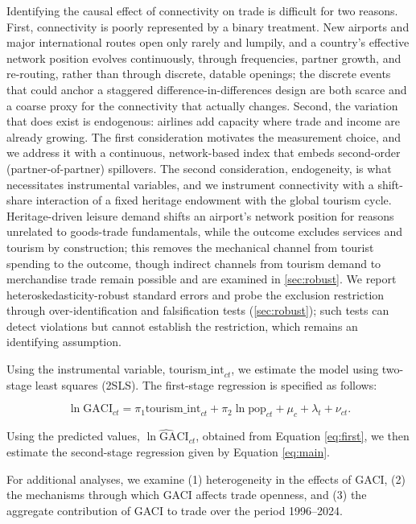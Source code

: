 Identifying the causal effect of connectivity on trade is difficult for two
reasons. First, connectivity is poorly represented by a binary treatment. New
airports and major international routes open only rarely and lumpily, and a
country's effective network position evolves continuously, through
frequencies, partner growth, and re-routing, rather than through discrete,
datable openings; the discrete events that could anchor a staggered
difference-in-differences design are both scarce and a coarse proxy for the
connectivity that actually changes. Second, the variation that does exist is
endogenous: airlines add capacity where trade and income are already growing.
The first consideration motivates the measurement choice, and we address it
with a continuous, network-based index that embeds second-order
(partner-of-partner) spillovers. The second consideration, endogeneity, is
what necessitates instrumental variables, and we instrument connectivity with
a shift-share interaction
\citep{GoldsmithPinkham_2020,Borusyak_2022} of a fixed heritage endowment with
the global tourism cycle. Heritage-driven leisure demand shifts an airport's
network position for reasons unrelated to goods-trade fundamentals, while the
outcome excludes services and tourism by construction; this removes the
mechanical channel from tourist spending to the outcome, though indirect
channels from tourism demand to merchandise trade remain possible and are
examined in \ref{sec:robust}. We report
heteroskedasticity-robust standard errors and probe the exclusion restriction
through over-identification and falsification tests (\ref{sec:robust}); such
tests can detect violations but cannot establish the restriction, which
remains an identifying assumption.

Using the instrumental variable, $\text{tourism\_int}_{ct}$, we estimate the model using two-stage least squares (2SLS). The first-stage regression is specified as follows:

\begin{equation}
\ln\mathrm{GACI}_{ct} = \pi_1\text{tourism\_int}_{ct} + \pi_2\ln\text{pop}_{ct} +  \mu_c + \lambda_t + \nu_{ct}.
  \label{eq:first}
  \end{equation}

Using the predicted values, $\widehat{\ln\mathrm{GACI}}_{ct}$, obtained from Equation \eqref{eq:first}, we then estimate the second-stage regression given by Equation \eqref{eq:main}.

For additional analyses, we examine (1) heterogeneity in the effects of GACI, (2) the mechanisms through which GACI affects trade openness, and (3) the aggregate contribution of GACI to trade over the period 1996--2024.

